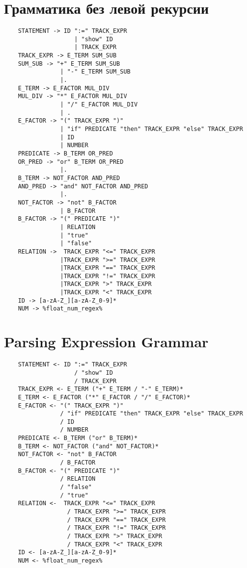 \section*{Грамматика без левой рекурсии}
\begin{lstlisting}
	STATEMENT -> ID ":=" TRACK_EXPR 
	    			| "show" ID 
	   				| TRACK_EXPR
	TRACK_EXPR -> E_TERM SUM_SUB
	SUM_SUB -> "+" E_TERM SUM_SUB 
	      		| "-" E_TERM SUM_SUB 
	     		|.
	E_TERM -> E_FACTOR MUL_DIV
	MUL_DIV -> "*" E_FACTOR MUL_DIV 
	      		| "/" E_FACTOR MUL_DIV 
	      		| .
	E_FACTOR -> "(" TRACK_EXPR ")" 
	    		| "if" PREDICATE "then" TRACK_EXPR "else" TRACK_EXPR 
	    		| ID 
	    		| NUMBER
	PREDICATE -> B_TERM OR_PRED
	OR_PRED -> "or" B_TERM OR_PRED 
	         	|.
	B_TERM -> NOT_FACTOR AND_PRED
	AND_PRED -> "and" NOT_FACTOR AND_PRED 
	      		|.
	NOT_FACTOR -> "not" B_FACTOR 
	      		| B_FACTOR
	B_FACTOR -> "(" PREDICATE ")" 
	    		| RELATION
	    		| "true" 
	    		| "false" 
	RELATION ->  TRACK_EXPR "<=" TRACK_EXPR 
	    		|TRACK_EXPR ">=" TRACK_EXPR 
	    		|TRACK_EXPR "==" TRACK_EXPR 
	    		|TRACK_EXPR "!=" TRACK_EXPR
	    		|TRACK_EXPR ">" TRACK_EXPR 
	    		|TRACK_EXPR "<" TRACK_EXPR 
	ID -> [a-zA-Z_][a-zA-Z_0-9]*
	NUM -> %float_num_regex%
\end{lstlisting}

\newpage
\section*{Parsing Expression Grammar}
\begin{lstlisting}
	STATEMENT <- ID ":=" TRACK_EXPR 
	    			/ "show" ID 
	   				/ TRACK_EXPR
	TRACK_EXPR <- E_TERM ("+" E_TERM / "-" E_TERM)*
	E_TERM <- E_FACTOR ("*" E_FACTOR / "/" E_FACTOR)*
	E_FACTOR <- "(" TRACK_EXPR ")" 
	    		/ "if" PREDICATE "then" TRACK_EXPR "else" TRACK_EXPR 
	    		/ ID 
	    		/ NUMBER
	PREDICATE <- B_TERM ("or" B_TERM)*
	B_TERM <- NOT_FACTOR ("and" NOT_FACTOR)*
	NOT_FACTOR <- "not" B_FACTOR 
	      		/ B_FACTOR
	B_FACTOR <- "(" PREDICATE ")" 
	    		/ RELATION
	    		/ "false" 
	    		/ "true" 
	RELATION <-  TRACK_EXPR "<=" TRACK_EXPR 
	    		  / TRACK_EXPR ">=" TRACK_EXPR 
	    		  / TRACK_EXPR "==" TRACK_EXPR 
	    		  / TRACK_EXPR "!=" TRACK_EXPR
	    		  / TRACK_EXPR ">" TRACK_EXPR 
                  / TRACK_EXPR "<" TRACK_EXPR 
	ID <- [a-zA-Z_][a-zA-Z_0-9]*
	NUM <- %float_num_regex%
\end{lstlisting}


